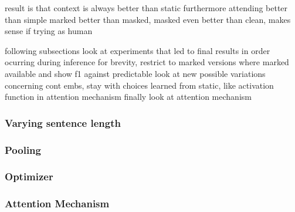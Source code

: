 result is that context is always better than static
furthermore attending better than simple
marked better than masked, masked even better than clean, makes sense if trying as human

following subsections look at experiments that led to final results in order ocurring during inference
for brevity, restrict to marked versions where marked available and show f1 against predictable
look at new possible variations concerning cont embs, stay with choices learned from static, like activation function in attention mechanism
finally look at attention mechanism

\subsubsection{Varying sentence length}
\label{subsubsec:5_experiments/4_texter/3_context/1_sent_len}


\subsubsection{Pooling}
\label{subsubsec:5_experiments/4_texter/3_context/2_pooling}


\subsubsection{Optimizer}
\label{subsubsec:5_experiments/4_texter/3_context/3_optimizer}


\subsubsection{Attention Mechanism}
\label{subsubsec:5_experiments/4_texter/3_context/4_attention}

